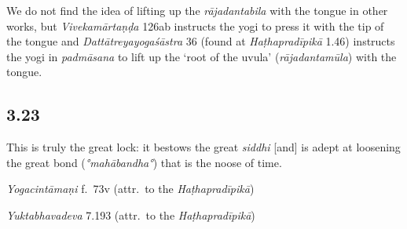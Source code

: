 \begin{ekdosis}
\begin{philcomm}[hp03_022]
We do not find the idea of lifting up the \emph{rājadantabila} with the tongue in other works, but \emph{Vivekamārtaṇḍa} 126ab instructs the yogi to press it with the tip of the tongue and \emph{Dattātreyayogaśāstra} 36 (found at \emph{Haṭhapradīpikā} 1.46) instructs the yogi in \emph{padmāsana} to lift up the `root of the uvula' (\emph{rājadantamūla}) with the tongue.
\end{philcomm}

\subsection*{3.23}
\begin{translation}[hp03_023]
This is truly the great lock: it bestows the great \emph{siddhi} [and] is adept at loosening the great bond (\emph{°mahābandha°}) that is the noose of time.
\end{translation}


\begin{testimonia}[hp03_023]
\emph{Yogacintāmaṇi} f.~73v (attr.~to the \emph{Haṭhapradīpikā})
\begin{versinnote}
\end{versinnote}

\emph{Yuktabhavadeva} 7.193 (attr.~to the \emph{Haṭhapradīpikā})
\begin{versinnote}
\end{versinnote}
\end{testimonia}



\end{ekdosis}
